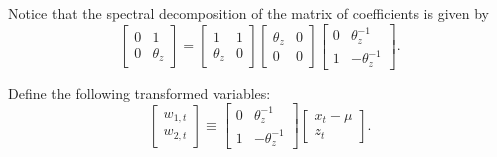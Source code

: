 Notice that the spectral decomposition of the matrix of coefficients is given by
\begin{equation}
     \left[ 
        \begin{matrix}
            0 & 1 \\
            0 & \theta_z
        \end{matrix}  
    \right]  =
     \left[ 
    \begin{matrix}
        1 & 1 \\
        \theta_z & 0
    \end{matrix}
    \right]
    \left[ 
    \begin{matrix}
        \theta_z & 0\\
        0 & 0
    \end{matrix}
    \right]  \left[ 
    \begin{matrix}
        0 & \theta_z^{-1} \\
        1 & -\theta_z^{-1}
    \end{matrix}
    \right].
\end{equation}

Define the following transformed variables:
\begin{equation}
    \left[
    \begin{matrix}
        w_{1,t}\\
        w_{2,t}
    \end{matrix}
    \right] \equiv \left[ 
    \begin{matrix}
        0 & \theta_z^{-1} \\
        1 & -\theta_z^{-1}
    \end{matrix}
    \right]\left[
    \begin{matrix}
        x_{t}-\mu\\
        z_t
    \end{matrix}
    \right].
\end{equation}

